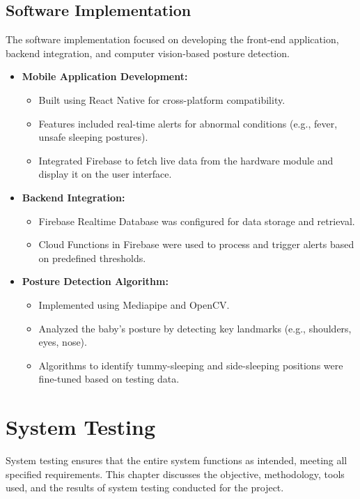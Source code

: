 \documentclass[12pt,a4paper]{report}
\begin{document}
\section{Software Implementation}
The software implementation focused on developing the front-end application, backend integration, and computer vision-based posture detection.
\begin{itemize}
  \item \textbf{Mobile Application Development:}
   \begin{itemize}
    \item Built using React Native for cross-platform compatibility.
    \item Features included real-time alerts for abnormal conditions (e.g., fever, unsafe sleeping postures).
    \item Integrated Firebase to fetch live data from the hardware module and display it on the user interface.
  \end{itemize}
  \item \textbf{Backend Integration:}
  \begin{itemize}
    \item Firebase Realtime Database was configured for data storage and retrieval.
    \item Cloud Functions in Firebase were used to process and trigger alerts based on predefined thresholds.
  \end{itemize}
  \item \textbf{Posture Detection Algorithm:}
  \begin{itemize}
    \item Implemented using Mediapipe and OpenCV.
    \item Analyzed the baby's posture by detecting key landmarks (e.g., shoulders, eyes, nose).
    \item Algorithms to identify tummy-sleeping and side-sleeping positions were fine-tuned based on testing data.
  \end{itemize}
\end{itemize}
\chapter{System Testing}

System testing ensures that the entire system functions as intended, meeting all specified requirements. This chapter discusses the objective, methodology, tools used, and the results of system testing conducted for the project.
\end{document}
